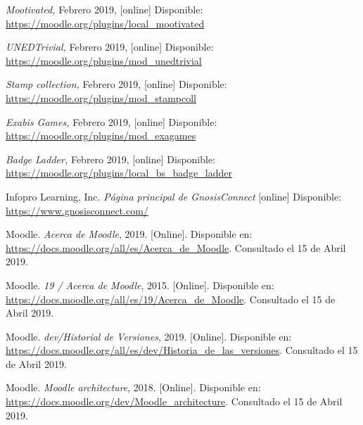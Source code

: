 \begin{thebibliography}{9}
        \textit{Mootivated,}
        Febrero 2019, [online] Disponible:  
        \url{https://moodle.org/plugins/local_mootivated}
    
        \textit{UNEDTrivial,}
        Febrero 2019, [online] Disponible:  
        \url{https://moodle.org/plugins/mod_unedtrivial}
    
        \textit{Stamp collection,}
        Febrero 2019, [online] Disponible:  
        \url{https://moodle.org/plugins/mod_stampcoll}
    
        \textit{Exabis Games,}
        Febrero 2019, [online] Disponible:  
        \url{https://moodle.org/plugins/mod_exagames}
    
        \textit{Badge Ladder,}
        Febrero 2019, [online] Disponible:  
        \url{https://moodle.org/plugins/local_bs_badge_ladder}
 
    Infopro Learning, Inc. \textit{Página principal de GnosisConnect} [online] Disponible:
    \url{https://www.gnosisconnect.com/}


        Moodle. {\it Acerca de Moodle}, 2019. [Online]. Disponible en:
        \url{https://docs.moodle.org/all/es/Acerca_de_Moodle}. Consultado el 15 de Abril 2019.
    
        Moodle. {\it 19 / Acerca de Moodle}, 2015. [Online]. Disponible en:
        \url{https://docs.moodle.org/all/es/19/Acerca_de_Moodle}. Consultado el 15 de Abril 2019.
    
        Moodle. {\it dev/Historial de Versiones}, 2019. [Online]. Disponible en:
        \url{https://docs.moodle.org/all/es/dev/Historia_de_las_versiones}. Consultado el 15 de Abril 2019.

        Moodle. {\it Moodle architecture}, 2018. [Online]. Disponible en:
        \url{https://docs.moodle.org/dev/Moodle_architecture}. Consultado el 15 de Abril 2019.
    

\end{thebibliography}
